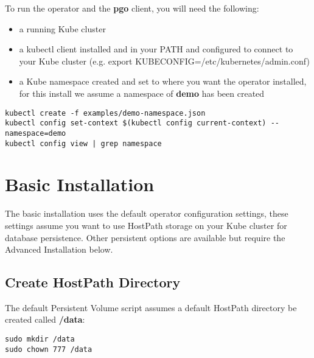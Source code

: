 \documentclass[letterpaper,12pt]{article}
\let\stdsection\section
\renewcommand\section{\newpage\stdsection}
\begin{document}
To run the operator and the \textbf{pgo} client, you will need the following:

\begin{itemize}
    \item a running Kube cluster 
    \item a kubectl client installed and in your PATH and configured to connect to your Kube cluster (e.g. export KUBECONFIG=/etc/kubernetes/admin.conf) 
    \item a Kube namespace created and set to where you want the operator installed, for this install we assume a namespace of \textbf{demo} has been created 
\end{itemize}\vspace{.75em}
\begin{lstlisting}
kubectl create -f examples/demo-namespace.json
kubectl config set-context $(kubectl config current-context) --namespace=demo
kubectl config view | grep namespace
\end{lstlisting}

\section{Basic Installation}\label{/_basic_installation}

The basic installation uses the default operator configuration settings, these settings assume you want to use HostPath storage on your Kube cluster for database persistence. Other persistent options are available but require the Advanced Installation below.

\subsection{Create HostPath Directory}\label{/_basic_installation/_create_hostpath_directory}

The default Persistent Volume script assumes a default HostPath directory be created called \textbf{/data}:
\vspace{.75em}
\begin{lstlisting}
sudo mkdir /data
sudo chown 777 /data
\end{lstlisting}
\end{document}
